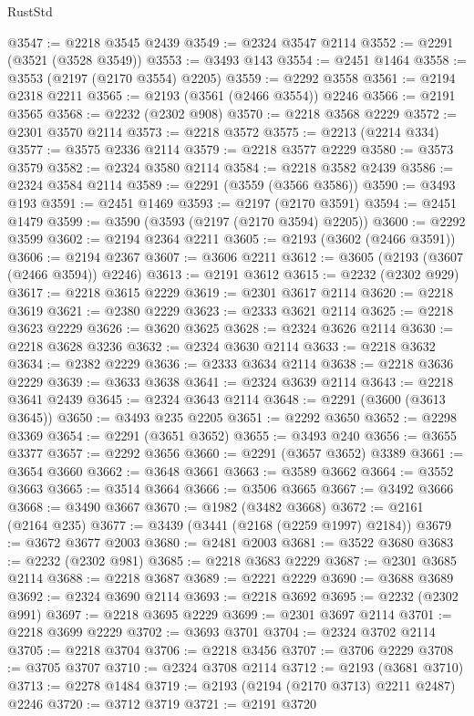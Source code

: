 \begin{lexlean}{RustStd}
\begin{coremodule}
@3547 := @2218 @3545 @2439
@3549 := @2324 @3547 @2114
@3552 := @2291 (@3521 (@3528 @3549))
@3553 := @3493 @143
@3554 := @2451 @1464
@3558 := @3553 (@2197 (@2170 @3554) @2205)
@3559 := @2292 @3558
@3561 := @2194 @2318 @2211
@3565 := @2193 (@3561 (@2466 @3554)) @2246
@3566 := @2191 @3565
@3568 := @2232 (@2302 @908)
@3570 := @2218 @3568 @2229
@3572 := @2301 @3570 @2114
@3573 := @2218 @3572
@3575 := @2213 (@2214 @334)
@3577 := @3575 @2336 @2114
@3579 := @2218 @3577 @2229
@3580 := @3573 @3579
@3582 := @2324 @3580 @2114
@3584 := @2218 @3582 @2439
@3586 := @2324 @3584 @2114
@3589 := @2291 (@3559 (@3566 @3586))
@3590 := @3493 @193
@3591 := @2451 @1469
@3593 := @2197 (@2170 @3591)
@3594 := @2451 @1479
@3599 := @3590 (@3593 (@2197 (@2170 @3594) @2205))
@3600 := @2292 @3599
@3602 := @2194 @2364 @2211
@3605 := @2193 (@3602 (@2466 @3591))
@3606 := @2194 @2367
@3607 := @3606 @2211
@3612 := @3605 (@2193 (@3607 (@2466 @3594)) @2246)
@3613 := @2191 @3612
@3615 := @2232 (@2302 @929)
@3617 := @2218 @3615 @2229
@3619 := @2301 @3617 @2114
@3620 := @2218 @3619
@3621 := @2380 @2229
@3623 := @2333 @3621 @2114
@3625 := @2218 @3623 @2229
@3626 := @3620 @3625
@3628 := @2324 @3626 @2114
@3630 := @2218 @3628 @3236
@3632 := @2324 @3630 @2114
@3633 := @2218 @3632
@3634 := @2382 @2229
@3636 := @2333 @3634 @2114
@3638 := @2218 @3636 @2229
@3639 := @3633 @3638
@3641 := @2324 @3639 @2114
@3643 := @2218 @3641 @2439
@3645 := @2324 @3643 @2114
@3648 := @2291 (@3600 (@3613 @3645))
@3650 := @3493 @235 @2205
@3651 := @2292 @3650
@3652 := @2298 @3369
@3654 := @2291 (@3651 @3652)
@3655 := @3493 @240
@3656 := @3655 @3377
@3657 := @2292 @3656
@3660 := @2291 (@3657 @3652) @3389
@3661 := @3654 @3660
@3662 := @3648 @3661
@3663 := @3589 @3662
@3664 := @3552 @3663
@3665 := @3514 @3664
@3666 := @3506 @3665
@3667 := @3492 @3666
@3668 := @3490 @3667
@3670 := @1982 (@3482 @3668)
@3672 := @2161 (@2164 @235)
@3677 := @3439 (@3441 (@2168 (@2259 @1997) @2184))
@3679 := @3672 @3677 @2003
@3680 := @2481 @2003
@3681 := @3522 @3680
@3683 := @2232 (@2302 @981)
@3685 := @2218 @3683 @2229
@3687 := @2301 @3685 @2114
@3688 := @2218 @3687
@3689 := @2221 @2229
@3690 := @3688 @3689
@3692 := @2324 @3690 @2114
@3693 := @2218 @3692
@3695 := @2232 (@2302 @991)
@3697 := @2218 @3695 @2229
@3699 := @2301 @3697 @2114
@3701 := @2218 @3699 @2229
@3702 := @3693 @3701
@3704 := @2324 @3702 @2114
@3705 := @2218 @3704
@3706 := @2218 @3456
@3707 := @3706 @2229
@3708 := @3705 @3707
@3710 := @2324 @3708 @2114
@3712 := @2193 (@3681 @3710)
@3713 := @2278 @1484
@3719 := @2193 (@2194 (@2170 @3713) @2211 @2487) @2246
@3720 := @3712 @3719
@3721 := @2191 @3720

\end{coremodule}
\end{lexlean}

